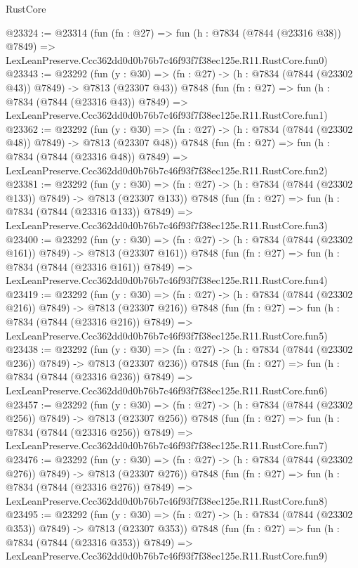 \begin{lexlean}{RustCore}
\begin{coremodule}
@23324 := @23314
    (fun (fn : @27) =>
    fun (h : @7834 (@7844 (@23316 @38)) @7849) =>
    LexLeanPreserve.Ccc362dd0d0b76b7c46f93f7f38ec125e.R11.RustCore.fun0)
@23343 := @23292
    (fun (y : @30) => (fn : @27) -> (h : @7834 (@7844 (@23302 @43)) @7849) -> @7813 (@23307 @43))
    @7848
    (fun (fn : @27) =>
    fun (h : @7834 (@7844 (@23316 @43)) @7849) =>
    LexLeanPreserve.Ccc362dd0d0b76b7c46f93f7f38ec125e.R11.RustCore.fun1)
@23362 := @23292
    (fun (y : @30) => (fn : @27) -> (h : @7834 (@7844 (@23302 @48)) @7849) -> @7813 (@23307 @48))
    @7848
    (fun (fn : @27) =>
    fun (h : @7834 (@7844 (@23316 @48)) @7849) =>
    LexLeanPreserve.Ccc362dd0d0b76b7c46f93f7f38ec125e.R11.RustCore.fun2)
@23381 := @23292
    (fun (y : @30) => (fn : @27) -> (h : @7834 (@7844 (@23302 @133)) @7849) -> @7813 (@23307 @133))
    @7848
    (fun (fn : @27) =>
    fun (h : @7834 (@7844 (@23316 @133)) @7849) =>
    LexLeanPreserve.Ccc362dd0d0b76b7c46f93f7f38ec125e.R11.RustCore.fun3)
@23400 := @23292
    (fun (y : @30) => (fn : @27) -> (h : @7834 (@7844 (@23302 @161)) @7849) -> @7813 (@23307 @161))
    @7848
    (fun (fn : @27) =>
    fun (h : @7834 (@7844 (@23316 @161)) @7849) =>
    LexLeanPreserve.Ccc362dd0d0b76b7c46f93f7f38ec125e.R11.RustCore.fun4)
@23419 := @23292
    (fun (y : @30) => (fn : @27) -> (h : @7834 (@7844 (@23302 @216)) @7849) -> @7813 (@23307 @216))
    @7848
    (fun (fn : @27) =>
    fun (h : @7834 (@7844 (@23316 @216)) @7849) =>
    LexLeanPreserve.Ccc362dd0d0b76b7c46f93f7f38ec125e.R11.RustCore.fun5)
@23438 := @23292
    (fun (y : @30) => (fn : @27) -> (h : @7834 (@7844 (@23302 @236)) @7849) -> @7813 (@23307 @236))
    @7848
    (fun (fn : @27) =>
    fun (h : @7834 (@7844 (@23316 @236)) @7849) =>
    LexLeanPreserve.Ccc362dd0d0b76b7c46f93f7f38ec125e.R11.RustCore.fun6)
@23457 := @23292
    (fun (y : @30) => (fn : @27) -> (h : @7834 (@7844 (@23302 @256)) @7849) -> @7813 (@23307 @256))
    @7848
    (fun (fn : @27) =>
    fun (h : @7834 (@7844 (@23316 @256)) @7849) =>
    LexLeanPreserve.Ccc362dd0d0b76b7c46f93f7f38ec125e.R11.RustCore.fun7)
@23476 := @23292
    (fun (y : @30) => (fn : @27) -> (h : @7834 (@7844 (@23302 @276)) @7849) -> @7813 (@23307 @276))
    @7848
    (fun (fn : @27) =>
    fun (h : @7834 (@7844 (@23316 @276)) @7849) =>
    LexLeanPreserve.Ccc362dd0d0b76b7c46f93f7f38ec125e.R11.RustCore.fun8)
@23495 := @23292
    (fun (y : @30) => (fn : @27) -> (h : @7834 (@7844 (@23302 @353)) @7849) -> @7813 (@23307 @353))
    @7848
    (fun (fn : @27) =>
    fun (h : @7834 (@7844 (@23316 @353)) @7849) =>
    LexLeanPreserve.Ccc362dd0d0b76b7c46f93f7f38ec125e.R11.RustCore.fun9)

\end{coremodule}
\end{lexlean}
